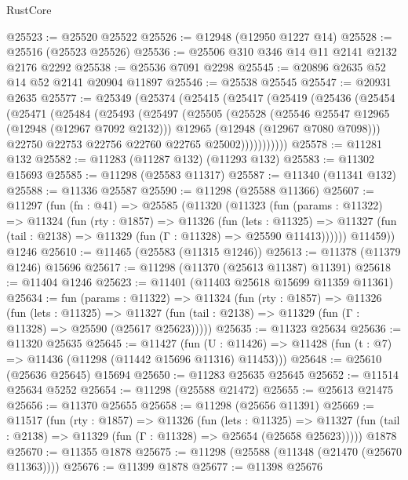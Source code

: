 \begin{lexlean}{RustCore}
\begin{coremodule}
@25523 := @25520 @25522
@25526 := @12948 (@12950 @1227 @14)
@25528 := @25516 (@25523 @25526)
@25536 := @25506 @310 @346 @14 @11 @2141 @2132 @2176 @2292
@25538 := @25536 @7091 @2298
@25545 := @20896 @2635 @52 @14 @52 @2141 @20904 @11897
@25546 := @25538 @25545
@25547 := @20931 @2635
@25577 := @25349
    (@25374
      (@25415
        (@25417
          (@25419
            (@25436
              (@25454
                (@25471
                  (@25484
                    (@25493
                      (@25497
                        (@25505
                          (@25528
                            (@25546 @25547 @12965 (@12948 (@12967 @7092 @2132)))
                            @12965
                            (@12948 (@12967 @7080 @7098)))
                          @22750
                          @22753
                          @22756
                          @22760
                          @22765
                          @25002)))))))))))
@25578 := @11281 @132
@25582 := @11283 (@11287 @132) (@11293 @132)
@25583 := @11302 @15693
@25585 := @11298 (@25583 @11317)
@25587 := @11340 (@11341 @132)
@25588 := @11336 @25587
@25590 := @11298 (@25588 @11366)
@25607 := @11297
    (fun (fn : @41) =>
    @25585
      (@11320
        (@11323
          (fun (params : @11322) =>
          @11324
            (fun (rty : @1857) =>
            @11326
              (fun (lets : @11325) =>
              @11327 (fun (tail : @2138) => @11329 (fun (Γ : @11328) => @25590 @11413))))))
        @11459))
    @1246
@25610 := @11465 (@25583 (@11315 @1246))
@25613 := @11378 (@11379 @1246) @15696
@25617 := @11298 (@11370 (@25613 @11387) @11391)
@25618 := @11404 @1246
@25623 := @11401 (@11403 @25618 @15699 @11359 @11361)
@25634 := fun (params : @11322) =>
  @11324
    (fun (rty : @1857) =>
    @11326
      (fun (lets : @11325) =>
      @11327 (fun (tail : @2138) => @11329 (fun (Γ : @11328) => @25590 (@25617 @25623)))))
@25635 := @11323 @25634
@25636 := @11320 @25635
@25645 := @11427
    (fun (U : @11426) => @11428 (fun (t : @7) => @11436 (@11298 (@11442 @15696 @11316) @11453)))
@25648 := @25610 (@25636 @25645) @15694
@25650 := @11283 @25635 @25645
@25652 := @11514 @25634 @5252
@25654 := @11298 (@25588 @21472)
@25655 := @25613 @21475
@25656 := @11370 @25655
@25658 := @11298 (@25656 @11391)
@25669 := @11517
    (fun (rty : @1857) =>
    @11326
      (fun (lets : @11325) =>
      @11327 (fun (tail : @2138) => @11329 (fun (Γ : @11328) => @25654 (@25658 @25623)))))
    @1878
@25670 := @11355 @1878
@25675 := @11298 (@25588 (@11348 (@21470 (@25670 @11363))))
@25676 := @11399 @1878
@25677 := @11398 @25676

\end{coremodule}
\end{lexlean}

